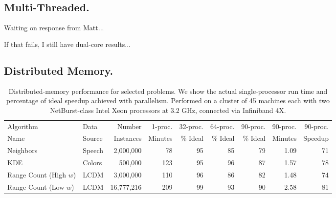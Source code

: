 \documentclass[twoside,leqno,twocolumn]{article}
\newcommand{\fig}[1]{Figure~\ref{fig:#1}}
\newcommand{\mysub}[1]{\subsection{#1.}}
\begin{document}
\mysub{Multi-Threaded}

Waiting on response from Matt...

If that fails, I still have dual-core results...


\mysub{Distributed Memory}


\begin{table}
  \centering
  \begin{tabular}{|l|l|r|r||r|r|r||r|r|}
    \hline
    Algorithm               & Data      & Number     & 1-proc. & 32-proc.  & 64-proc.  & 90-proc.  & 90-proc. & 90-proc.
    \\
    Name                    & Source    & Instances  & Minutes & \% Ideal & \% Ideal & \% Ideal & Minutes & Speedup
    \\ \hline \hline
    Neighbors               & Speech    & 2,000,000  & 78  & 95 & 85 & 79 & 1.09 & 71
    \\ \hline
    KDE                     & Colors    & 500,000    & 123 & 95 & 96 & 87 & 1.57 & 78
    \\ \hline
    Range Count (High $w$)  & LCDM      & 3,000,000  & 110 & 96 & 86 & 82 & 1.48 & 74
    \\ \hline
    Range Count (Low $w$)   & LCDM      & 16,777,216 & 209 & 99 & 93 & 90 & 2.58 & 81
    \\ \hline
  \end{tabular}
  \caption{
  \label{tab:distributed}
  Distributed-memory performance for selected problems.
  We show the actual single-processor run time and percentage of ideal speedup achieved with parallelism.
  Performed on a cluster of 45 machines each with two NetBurst-class Intel Xeon processors at 3.2 GHz, connected via Infiniband 4X.
  }
\end{table}
\end{document}
